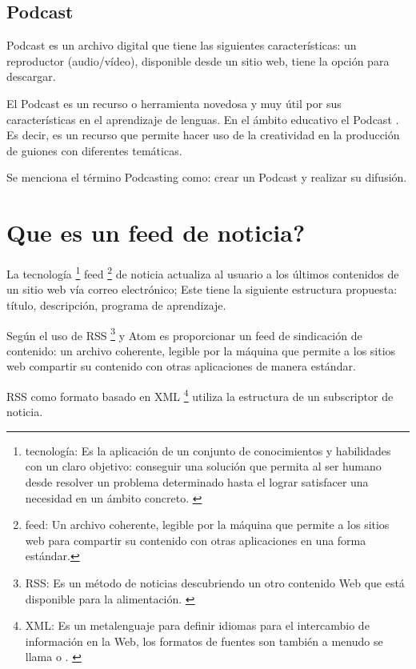 \subsection{Podcast}

Podcast es un archivo digital que tiene las siguientes características: un
reproductor (audio/vídeo), disponible desde un sitio web, tiene la opción
para descargar.

El Podcast es un recurso o herramienta novedosa y muy útil por sus
características en el aprendizaje de lenguas. En el ámbito educativo 
el Podcast  \cite{chacon2011podcast}. Es decir, es un recurso que permite hacer
uso de la creatividad en la producción de guiones con diferentes 
temáticas. \cite{AFSTVV2014}
 
Se menciona el término Podcasting como: crear un Podcast y realizar su difusión.

\section{\textquestiondown Que es un feed de noticia?}

La tecnología \footnote{tecnología: Es la aplicación de un conjunto de
conocimientos y habilidades con un claro objetivo: conseguir una solución que
permita al ser humano desde resolver un problema determinado hasta el lograr
satisfacer una necesidad en un ámbito concreto. \cite{technology}} feed
\footnote{feed: Un archivo coherente, legible por la máquina que
permite a los sitios web para compartir su contenido con otras aplicaciones en
una forma estándar.\cite{hammersley2005developing}} de noticia
actualiza al usuario a los últimos contenidos de un sitio web vía correo
electrónico; Este tiene la siguiente estructura propuesta: título, descripción,
programa de aprendizaje.

Según \cite{hammersley2005developing} el uso de RSS \footnote{RSS: Es un
método de noticias descubriendo un otro contenido Web que está disponible
para la alimentación. \cite{zeki2004rss}} y Atom es proporcionar un feed de
sindicación de contenido: un archivo coherente, legible por la máquina que
permite a los sitios web compartir su contenido con otras aplicaciones de
manera estándar.

RSS como formato basado en XML \footnote{XML: Es un metalenguaje para definir
idiomas para el intercambio de información en la Web, los formatos de fuentes
son también a menudo se llama  o 
. \cite{wittenbrink2005rss}} utiliza la
estructura de un subscriptor de noticia.

